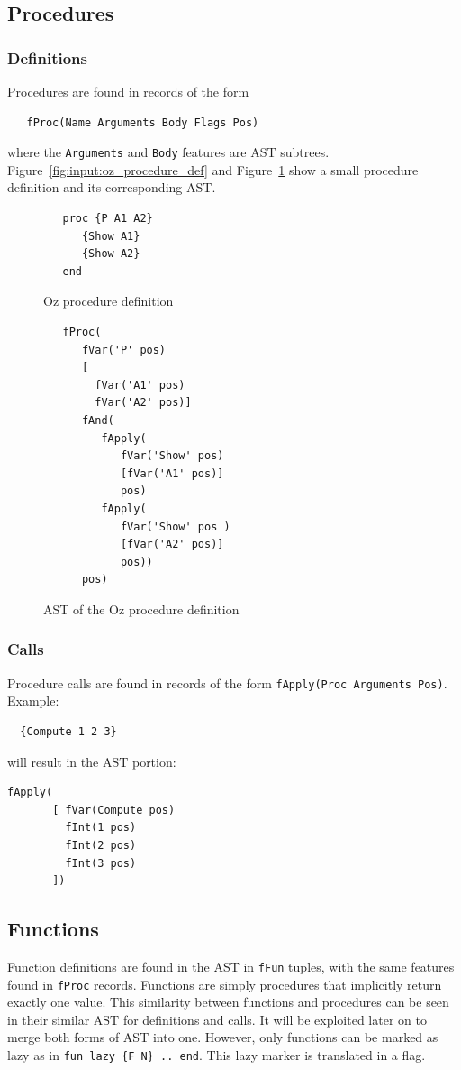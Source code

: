 \documentclass[a4paper]{memoir}
\begin{document}
\subsection{Procedures}\label{sec:input:procedures}
\subsubsection{Definitions}
Procedures are found in records of the form 
\begin{lstlisting}
   fProc(Name Arguments Body Flags Pos) 
\end{lstlisting}
where the \lstinline!Arguments! and \lstinline!Body! features are AST subtrees. 
Figure~\ref{fig:input:oz_procedure_def} and Figure~\ref{fig:input:ast_procedure_def} show a small procedure definition and its corresponding AST.
\begin{figure}[ht]
\begin{lstlisting}
   proc {P A1 A2}
      {Show A1}
      {Show A2}
   end
\end{lstlisting}
\caption{Oz procedure definition}
\label{fig:input:oz_procedure_def}

\begin{lstlisting}
   fProc(
      fVar('P' pos)
      [
        fVar('A1' pos)
        fVar('A2' pos)]
      fAnd(
         fApply(
            fVar('Show' pos)
            [fVar('A1' pos)]
            pos)
         fApply(
            fVar('Show' pos )
            [fVar('A2' pos)]
            pos))
      pos)
\end{lstlisting}
\caption{AST of the Oz procedure definition}
\label{fig:input:ast_procedure_def}
\end{figure}



\subsubsection{Calls}
Procedure calls are found in records of the form 
\lstinline!fApply(Proc Arguments Pos)!. 
Example:

\begin{lstlisting}
  {Compute 1 2 3}
\end{lstlisting}

will result in the AST portion:
\begin{lstlisting}
fApply(
       [ fVar(Compute pos)
         fInt(1 pos)
         fInt(2 pos)
         fInt(3 pos)
       ])
\end{lstlisting}

\subsection{Functions}\label{sec:input:functions}
Function definitions are found in the AST in \lstinline!fFun! tuples, with the
same features found in \lstinline!fProc! records. Functions are simply
procedures that implicitly return exactly one value. This similarity between
functions and procedures can be seen in their similar AST for definitions and
calls. It will be exploited later on to merge both forms of AST
into one.
However, only functions can be marked as lazy as in \lstinline!fun lazy {F N} .. end!. This lazy marker is translated in a flag.
\end{document}

